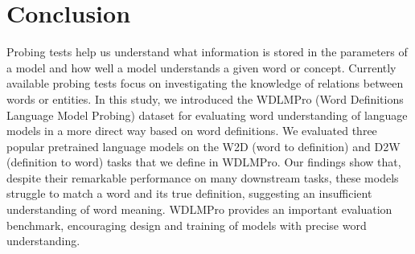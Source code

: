 \documentclass[11pt,a4paper]{article}
\begin{document}
\section{Conclusion}

Probing tests help us understand what information
is stored in the parameters of a model and how well a model
understands a given word or concept. Currently available
probing tests focus on investigating the 
knowledge of relations between words or entities. In this study, we
introduced the WDLMPro (Word Definitions Language Model Probing)
dataset for evaluating word understanding of language models
in a more direct way based on word definitions. We evaluated
three popular pretrained language models on
the W2D (word to definition) and D2W (definition to word)
tasks that we define in
WDLMPro. Our findings show that, despite their remarkable
performance on many downstream tasks, these models struggle
to match a word and its true definition, suggesting an
insufficient understanding of word meaning. WDLMPro provides an
important evaluation benchmark, encouraging design and
training of models with precise word understanding.



\end{document}
